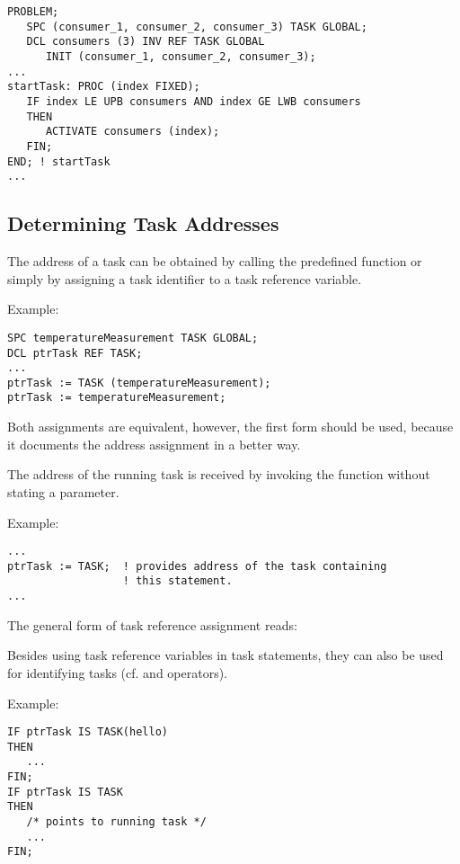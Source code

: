 \begin{lstlisting}
PROBLEM;
   SPC (consumer_1, consumer_2, consumer_3) TASK GLOBAL;
   DCL consumers (3) INV REF TASK GLOBAL
      INIT (consumer_1, consumer_2, consumer_3);
...
startTask: PROC (index FIXED);
   IF index LE UPB consumers AND index GE LWB consumers
   THEN
      ACTIVATE consumers (index);
   FIN;
END; ! startTask
...
\end{lstlisting}

\subsection{Determining Task Addresses}  %

The address of a task can be obtained by calling the predefined
function  or simply by assigning a task identifier to a task
reference variable.

Example:

\begin{lstlisting}
SPC temperatureMeasurement TASK GLOBAL;
DCL ptrTask REF TASK;
...
ptrTask := TASK (temperatureMeasurement);
ptrTask := temperatureMeasurement;
\end{lstlisting}

Both assignments are equivalent, however, the first form should be used,
because it documents the address assignment in a better way.

The address of the running task is received by invoking the function
 without stating a parameter.

Example:

\begin{lstlisting}
...
ptrTask := TASK;  ! provides address of the task containing
                  ! this statement.
...
\end{lstlisting}

The general form of task reference assignment reads:

\begin{grammarframe}

\end{grammarframe}

Besides using task reference variables in task statements, they can
also be used for identifying tasks (cf.  and  operators).

Example:

\begin{lstlisting}
IF ptrTask IS TASK(hello)
THEN
   ...
FIN;
IF ptrTask IS TASK
THEN
   /* points to running task */
   ...
FIN;
\end{lstlisting}


